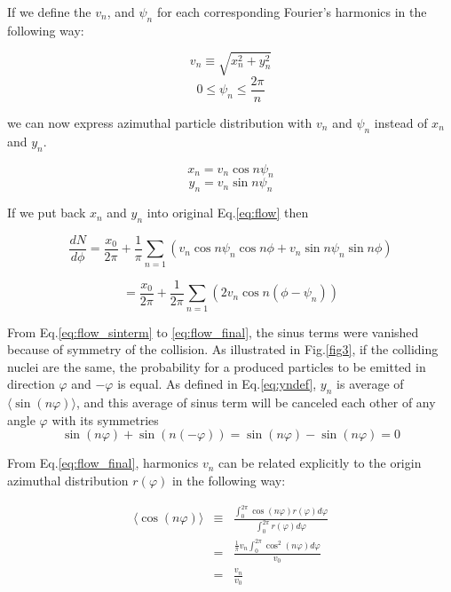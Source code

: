  If we define the $v_n$, and $\psi_n$ for each corresponding Fourier's harmonics in the following way:

\begin{equation}
	v_n \equiv \sqrt{x_n^2 + y_n^2}
\end{equation}
\begin{equation}
	0 \le \psi_n \le \frac{2\pi}{n} 
\end{equation}
\smallskip

we can now express azimuthal particle distribution with $v_n$ and $\psi_n$ instead of $x_n$ and $y_n$.

\begin{equation}
x_n=v_n \cos{n\psi_n}
\end{equation}
\begin{equation}
y_n=v_n \sin{n\psi_n}
\label{eq:xnyndef}
\end{equation}
\smallskip

If we put back $x_n$ and $y_n$ into original Eq.\ref{eq:flow}  then

\begin{equation}
\frac{dN}{d\phi}=\frac{x_0}{2\pi}+\frac{1}{\pi}\sum_{n=1}{(v_n\cos{n\psi_n}\cos{n\phi}+v_n\sin{n\psi_n}\sin{n\phi})}
\label{eq:flow_sinterm}
\end{equation}

\begin{equation}
=\frac{x_0}{2\pi}+\frac{1}{2\pi}\sum_{n=1}{(2v_n\cos{n(\phi-\psi_n)})}
\label{eq:flow_final}
\end{equation}
\smallskip


From Eq.\ref{eq:flow_sinterm} to \ref{eq:flow_final}, the sinus terms were vanished because of symmetry of the collision. As illustrated in Fig.\ref{fig3}, if the colliding nuclei are the same, the probability for a produced particles to be emitted in direction $\varphi$ and $-\varphi$ is equal. As defined in Eq.\ref{eq:yndef}, $y_n$ is average of $\langle \sin(n\varphi) \rangle$, and this average of sinus term will be canceled each other of any angle $\varphi$ with its symmetries
\begin{equation}
	\sin(n\varphi) + \sin(n(-\varphi)) = \sin(n\varphi) - \sin(n\varphi) =0
\end{equation}

From Eq.\ref{eq:flow_final}, harmonics $v_n$ can be related explicitly to the origin azimuthal distribution $r(\varphi)$ in the following way:

\begin{eqnarray}
	\langle \cos(n\varphi) \rangle &\equiv& \frac{\int_{0}^{2\pi}{\cos(n\varphi)r(\varphi)d\varphi}}{\int_0^{2\pi}{r(\varphi)d\varphi}} \\
	&=&\frac{\frac{1}{\pi} v_n \int_{0}^{2\pi}{\cos^2(n\varphi)d\varphi}}{v_0} \\ 
	&=& \frac{v_n}{v_0}
	\label{eq:vncal}
\end{eqnarray}

